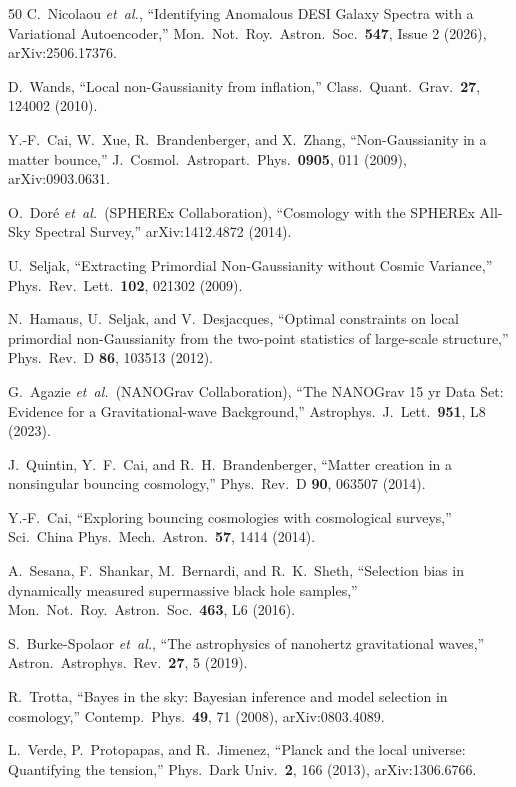 \documentclass[aps,prd,twocolumn,superscriptaddress,showpacs,preprintnumbers,nofootinbib,longbibliography,floatfix]{revtex4-2}
\newcommand{\etal}{\textit{et~al.}}
\begin{document}
\begin{thebibliography}{50}
C.\ Nicolaou \etal,
``Identifying Anomalous DESI Galaxy Spectra with a Variational Autoencoder,''
Mon.\ Not.\ Roy.\ Astron.\ Soc.\ \textbf{547}, Issue 2 (2026), arXiv:2506.17376.

D.\ Wands,
``Local non-Gaussianity from inflation,''
Class.\ Quant.\ Grav.\ \textbf{27}, 124002 (2010).

Y.-F.\ Cai, W.\ Xue, R.\ Brandenberger, and X.\ Zhang,
``Non-Gaussianity in a matter bounce,''
J.\ Cosmol.\ Astropart.\ Phys.\ \textbf{0905}, 011 (2009), arXiv:0903.0631.

O.\ Dor\'e \etal\ (SPHEREx Collaboration),
``Cosmology with the SPHEREx All-Sky Spectral Survey,''
arXiv:1412.4872 (2014).

U.\ Seljak,
``Extracting Primordial Non-Gaussianity without Cosmic Variance,''
Phys.\ Rev.\ Lett.\ \textbf{102}, 021302 (2009).

N.\ Hamaus, U.\ Seljak, and V.\ Desjacques,
``Optimal constraints on local primordial non-Gaussianity from the two-point statistics of large-scale structure,''
Phys.\ Rev.\ D \textbf{86}, 103513 (2012).


G.\ Agazie \etal\ (NANOGrav Collaboration),
``The NANOGrav 15 yr Data Set: Evidence for a Gravitational-wave Background,''
Astrophys.\ J.\ Lett.\ \textbf{951}, L8 (2023).


J.\ Quintin, Y.\ F.\ Cai, and R.\ H.\ Brandenberger,
``Matter creation in a nonsingular bouncing cosmology,''
Phys.\ Rev.\ D \textbf{90}, 063507 (2014).

Y.-F.\ Cai,
``Exploring bouncing cosmologies with cosmological surveys,''
Sci.\ China Phys.\ Mech.\ Astron.\ \textbf{57}, 1414 (2014).

A.\ Sesana, F.\ Shankar, M.\ Bernardi, and R.\ K.\ Sheth,
``Selection bias in dynamically measured supermassive black hole samples,''
Mon.\ Not.\ Roy.\ Astron.\ Soc.\ \textbf{463}, L6 (2016).

S.\ Burke-Spolaor \etal,
``The astrophysics of nanohertz gravitational waves,''
Astron.\ Astrophys.\ Rev.\ \textbf{27}, 5 (2019).

R.\ Trotta,
``Bayes in the sky: Bayesian inference and model selection in cosmology,''
Contemp.\ Phys.\ \textbf{49}, 71 (2008), arXiv:0803.4089.

L.\ Verde, P.\ Protopapas, and R.\ Jimenez,
``Planck and the local universe: Quantifying the tension,''
Phys.\ Dark Univ.\ \textbf{2}, 166 (2013), arXiv:1306.6766.


\end{thebibliography}
\end{document}
